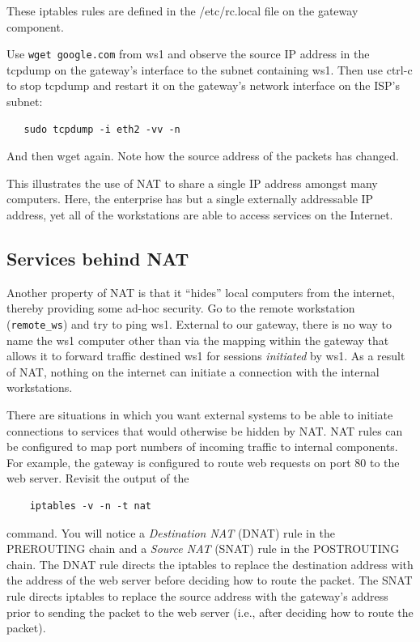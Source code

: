 These iptables rules are defined in the /etc/rc.local file on the gateway component.  

Use {\tt wget google.com} from ws1 and observe the source IP address in the tcpdump on the gateway's interface
to the subnet containing ws1.  Then use ctrl-c to stop tcpdump and restart it on the gateway's
network interface on the ISP's subnet:
\begin{verbatim}
   sudo tcpdump -i eth2 -vv -n
\end{verbatim}
\noindent And then wget again.  Note how the source address of the packets has changed.

This illustrates the use of NAT to share a single IP address amongst many computers.  Here,
the enterprise has but a single externally addressable IP address, yet all of the workstations are able to 
access services on the Internet.

\subsection{Services behind NAT}
Another property of NAT is that it ``hides'' local computers from the internet, thereby providing some
ad-hoc security.  Go to the remote workstation
({\tt remote\_ws}) and try to ping ws1.  External to our gateway, there is no way to name the ws1 computer other than
via the mapping within the gateway that allows it to forward traffic destined ws1 for sessions \textit{initiated} by ws1.
As a result of NAT, nothing on the internet can initiate a connection with the internal workstations.  

There are situations in which you want external systems to be able to initiate connections to services that would
otherwise be hidden by NAT.
NAT rules can be configured to map port numbers of incoming traffic to internal components.  For example, the gateway
is configured to route web requests on port 80 to the web server.  Revisit the output of the
\begin{verbatim}
    iptables -v -n -t nat
\end{verbatim}
command. You will notice a \textit{Destination NAT} (DNAT) rule in the PREROUTING chain and 
a \textit{Source NAT} (SNAT) rule in the POSTROUTING chain. 
The DNAT rule directs the iptables to replace the destination address with the address of the web server before
deciding how to route the packet.
The SNAT rule directs iptables to replace the source address with the gateway's address prior to sending
the packet to the web server (i.e., after deciding how to route the packet).

